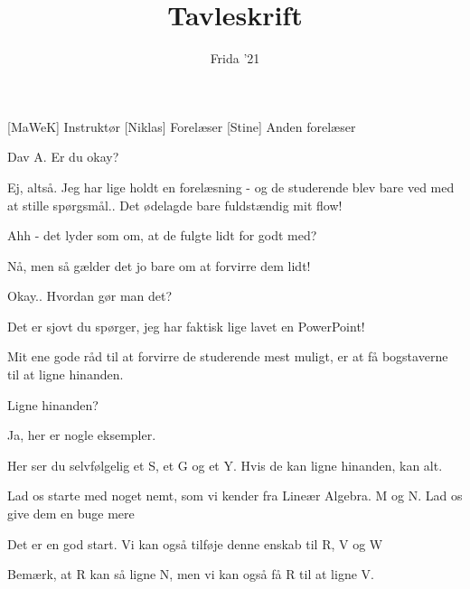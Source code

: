 \documentclass[a4paper,11pt]{article}
\title{Tavleskrift}
\author{Frida '21}
\begin{document}
\maketitle

\begin{roles}
[MaWeK] Instruktør
[Niklas] Forelæser
[Stine] Anden forelæser
\end{roles}

\begin{props}
\end{props}


\begin{sketch}


 Dav A. Er du okay?

 Ej, altså. Jeg har lige holdt en forelæsning - og de studerende blev bare ved med at stille spørgsmål.. Det ødelagde bare fuldstændig mit flow!

 Ahh - det lyder som om, at de fulgte lidt for godt med?


 Nå, men så gælder det jo bare om at forvirre dem lidt!

 Okay.. Hvordan gør man det?

 Det er sjovt du spørger, jeg har faktisk lige lavet en PowerPoint!


 Mit ene gode råd til at forvirre de studerende mest muligt, er at få bogstaverne til at ligne hinanden.

 Ligne hinanden?

 Ja, her er nogle eksempler. 

 Her ser du selvfølgelig et S, et G og et Y. Hvis de kan ligne hinanden, kan alt.

 Lad os starte med noget nemt, som vi kender fra Lineær Algebra. M og N. Lad os give dem en buge mere 

 Det er en god start. Vi kan også tilføje denne enskab til R, V og W

 Bemærk, at R kan så ligne N, men vi kan også få R til at ligne V. 


\end{sketch}
\end{document}
